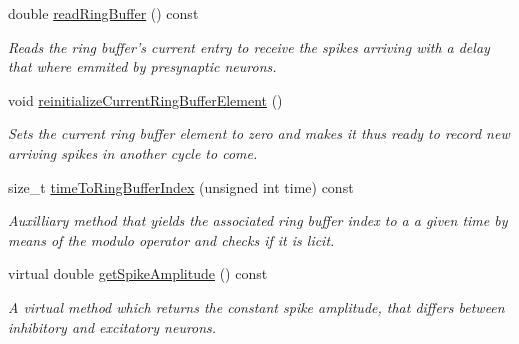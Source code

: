 \begin{DoxyCompactItemize}
double \hyperlink{classNeuron_a763493ef8eff51a638cbb75f0983b828}{read\-Ring\-Buffer} () const 
\begin{DoxyCompactList}\small\item\em Reads the ring buffer's current entry to receive the spikes arriving with a delay that where emmited by presynaptic neurons. \end{DoxyCompactList}\item 
void \hyperlink{classNeuron_a41dd9577d84a48bd427201b4b8234150}{reinitialize\-Current\-Ring\-Buffer\-Element} ()
\begin{DoxyCompactList}\small\item\em Sets the current ring buffer element to zero and makes it thus ready to record new arriving spikes in another cycle to come. \end{DoxyCompactList}\item 
size\-\_\-t \hyperlink{classNeuron_af1c7b80b5e70e906734ce710d37b1fd7}{time\-To\-Ring\-Buffer\-Index} (unsigned int time) const 
\begin{DoxyCompactList}\small\item\em Auxilliary method that yields the associated ring buffer index to a a given time by means of the modulo operator and checks if it is licit. \end{DoxyCompactList}\item 
virtual double \hyperlink{classNeuron_aec2283fbfaba764cd088e6d16b0a74bb}{get\-Spike\-Amplitude} () const 
\begin{DoxyCompactList}\small\item\em A virtual method which returns the constant spike amplitude, that differs between inhibitory and excitatory neurons. \end{DoxyCompactList}\end{DoxyCompactItemize}
